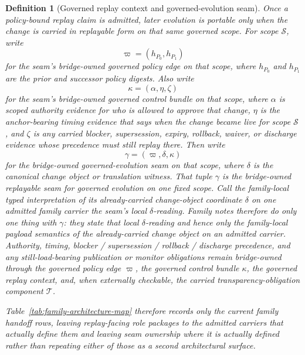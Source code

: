 \documentclass[11pt]{article}
\newtheorem{definition}{Definition}
\begin{document}
\begin{definition}[Governed replay context and governed-evolution seam]
Once a policy-bound replay claim is admitted, later evolution is portable only when the change is carried in replayable form on that same governed scope.
For scope $\mathcal{S}$, write
\[
\varpi=(h_{P_0},h_{P_1})
\]
for the seam's bridge-owned \emph{governed policy edge} on that scope, where $h_{P_0}$ and $h_{P_1}$ are the prior and successor policy digests.
Also write
\[
\kappa=(\alpha,\eta,\zeta)
\]
for the seam's bridge-owned \emph{governed control bundle} on that scope, where $\alpha$ is scoped authority evidence for who is allowed to approve that change, $\eta$ is the anchor-bearing timing evidence that says when the change became live for scope $\mathcal{S}$, and $\zeta$ is any carried blocker, supersession, expiry, rollback, waiver, or discharge evidence whose precedence must still replay there.
Then write
\[
\gamma=(\varpi,\delta,\kappa)
\]
for the bridge-owned governed-evolution seam on that scope, where $\delta$ is the canonical change object or translation witness.
That tuple $\gamma$ is the bridge-owned replayable seam for governed evolution on one fixed scope.
Call the family-local typed interpretation of its already-carried change-object coordinate $\delta$ on one admitted family carrier the seam's \emph{local $\delta$-reading}.
Family notes therefore do only one thing with $\gamma$: they state that local $\delta$-reading and hence only the family-local payload semantics of the already-carried change object on an admitted carrier.
Authority, timing, blocker / supersession / rollback / discharge precedence, and any still-load-bearing publication or monitor obligations remain bridge-owned through the governed policy edge $\varpi$, the governed control bundle $\kappa$, the governed replay context, and, when externally checkable, the carried transparency-obligation component $\mathcal{T}$.

Table~\ref{tab:family-architecture-map} therefore records only the current family handoff rows, leaving replay-facing role packages to the admitted carriers that actually define them and leaving seam ownership where it is actually defined rather than repeating either of those as a second architectural surface.
\end{definition}
\end{document}
